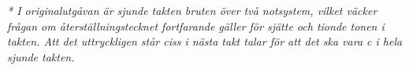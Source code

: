 \vspace{5mm}
\textit{* I originalutgåvan är sjunde takten bruten över två notsystem, vilket väcker frågan om
återställningstecknet fortfarande gäller för sjätte och tionde tonen i takten.
Att det uttryckligen står ciss i nästa takt talar för att det ska vara c i hela sjunde takten.}